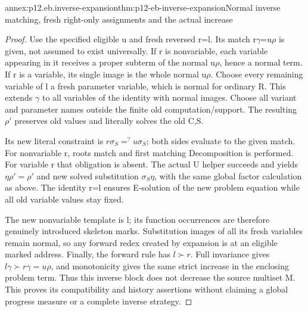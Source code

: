 \begin{annexitem}{annex:p12.eb.inverse-expansion}{thm:p12-eb-inverse-expansion}{Normal inverse matching, fresh right-only assignments and the actual increase}
\begin{proof}
Use the specified eligible u and fresh reversed r=l. Its
match r\(\gamma\)=u\(\rho\) is given, not assumed to
exist universally. If r is nonvariable, each variable appearing
in it receives a proper subterm of the normal u\(\rho\),
hence a normal term. If r is a variable, its single image is
the whole normal u\(\rho\). Choose every remaining variable
of l a fresh parameter variable, which is normal for ordinary R.
This extends \(\gamma\) to all variables of the identity with
normal images. Choose all variant and parameter names outside
the finite old computation/support. The resulting \(\rho'\)
preserves old values and literally solves the old C,S.

Its new literal constraint is
\(r\sigma_S=^{?}u\sigma_S\); both sides evaluate to the
given match. For nonvariable r, roots match and first matching
Decomposition is performed. For variable r that obligation is
absent. The actual U helper succeeds and yields
\(\eta\rho'=\rho'\) and new solved substitution
\(\sigma_S\eta\), with the same global factor calculation
as above. The identity r=l ensures E-solution of the new
problem equation while all old variable values stay fixed.

The new nonvariable template is l; its function occurrences
are therefore genuinely introduced skeleton marks. Substitution
images of all its fresh variables remain normal, so any forward
redex created by expansion is at an eligible marked address.
Finally, the forward rule has \(l\succ r\). Full invariance
gives \(l\gamma\succ r\gamma=u\rho\), and monotonicity
gives the same strict increase in the enclosing problem term.
Thus this inverse block does not decrease the source multiset M.
This proves its compatibility and history assertions without
claiming a global progress measure or a complete inverse strategy.
\end{proof}
\end{annexitem}

